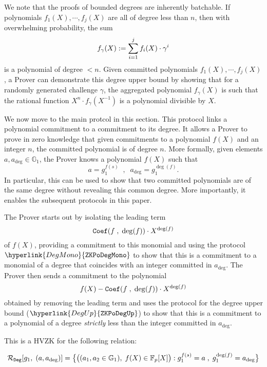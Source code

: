 \documentclass[11pt, lettersize, notitlepage, leqno, footskip=0.6cm]{article}
\newcommand{\bFp}{\mathbb{F}_p}
\newcommand{\mc}{\mathcal}
\newcommand{\mb}{\mathbb}
\newcommand{\vs}{\vspace{-0.15cm}}
\newcommand{\noin}{\noindent}
\newcommand{\op}{overwhelming probability}
\numberwithin{equation}{section}
\begin{document}
\noin We note that the proofs of bounded degrees are inherently batchable. If polynomials $f_1(X),\cdots,f_j(X)$ are all of degree less than $n$, then with \op, the sum \vs $$ f_{\gamma}(X):= \sum\limits_{i=1}^j f_i(X)\cdot \gamma^i \vs $$ is a polynomial of degree $< n$. Given committed polynomials $f_1(X),\cdots,f_j(X)$, a Prover can demonstrate this degree upper bound by showing that for a randomly generated challenge $\gamma$, the aggregated polynomial $ f_{\gamma}(X) $ is such that the rational function $X^n\cdot f_{\gamma}(X^{-1})$ is a polynomial divisible by $X$.





We now move to the main protcol in this section. This protocol links a polynomial commitment to a commitment to its degree. It allows a Prover to prove in zero knowledge that given commitments to a polynomial $f(X)$ and an integer $n$, the committed polynomial is of degree $n$. More formally, given elements $a, a_{\deg}\in \mb{G}_1$, the Prover knows a polynomial $f(X)$ such that \vs $$a = g_1^{f(s)}\;\;,\;\;a_{\deg} = g_1^{\deg(f)}. $$ In particular, this can be used to show that two committed polynomials are of the same degree without revealing this common degree. More importantly, it enables the subsequent protocols in this paper.



The Prover starts out by isolating the leading term \vs $${\tt{Coef}}(f\;,\;\deg(f))\cdot X^{\deg(f)} $$ of $f(X)$, providing a commitment to this monomial and using the protocol $\hyperlink{DegMono}{\tt{ZKPoDegMono}}$ to show that this is a commitment to a monomial of a degree that coincides with an integer committed in $a_{\deg}$. The Prover then sends a commitment to the polynomial \vs $$ f(X)-{\tt{Coef}}(f\;,\;\deg(f))\cdot X^{\deg(f)} $$ obtained by removing the leading term and uses the protocol for the degree upper bound ($\hyperlink{DegUp}{\tt{ZKPoDegUp}}$) to show that this is a commitment to a polynomial of a degree \textit{strictly} less than the integer committed in $a_{\deg}$.

This is a HVZK for the following relation:

\vspace{-3mm} $$\mc{R}_{\tt{Deg}}[g_1,\;(a,a_{\deg})] = \big\{\big((a_1,a_2\in\mb{G}_1),\; f(X)\in \bFp[X]\big): g_1^{f(s)} = a\;,\; g_1^{\deg(f)} = a_{\deg} \big\} $$
\end{document}
